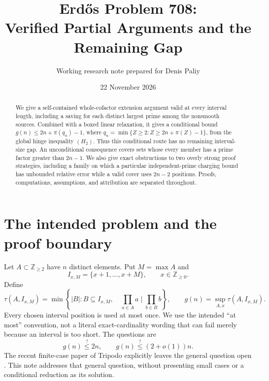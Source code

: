 \documentclass[11pt,a4paper]{article}
\title{Erd\H{o}s Problem 708:\\Verified Partial Arguments and the Remaining Gap}
\author{Working research note prepared for Denis Paliy}
\date{22 November 2026}
\theoremstyle{remark}
\newcommand{\II}{I_{x,M}}
\begin{document}
\maketitle
\begin{center}
\end{center}

\begin{abstract}
We give a self-contained whole-cofactor extension argument valid at every
interval length, including a saving for each distinct largest prime among
the nonsmooth sources. Combined with a boxed linear relaxation, it gives a
conditional bound $g(n)\le 2n+\pi(q_n)-1$, where
$q_n=\min\{Z\ge2:Z\ge2n+\pi(Z)-1\}$, from the global hinge inequality
$(H_2)$. Thus this conditional route has no remaining interval-size gap.
An unconditional consequence covers sets whose every member has a prime
factor greater than $2n-1$. We also give exact obstructions to two
overly strong proof strategies, including a family on which a particular
independent-prime charging bound has unbounded relative error while a
valid cover uses $2n-2$ positions. Proofs, computations, assumptions, and
attribution are separated throughout.
\end{abstract}

\section{The intended problem and the proof boundary}
Let $A\subset\mathbb Z_{\ge2}$ have $n$ distinct elements. Put
$M=\max A$ and
\[
 \II=\{x+1,\ldots,x+M\},\qquad x\in\mathbb Z_{\ge0}.
\]
Define
\[
 \tau(A,\II)=\min\left\{|B|:B\subseteq\II,\quad
              \prod_{a\in A}a\mid\prod_{b\in B}b\right\},
 \qquad g(n)=\sup_{A,x}\tau(A,\II).
\]
Every chosen interval position is used at most once. We use the intended
``at most'' convention, not a literal exact-cardinality wording that can
fail merely because an interval is too short. The questions are
\[
 g(n)\stackrel{?}{\le}2n,\qquad
 g(n)\stackrel{?}{\le}(2+o(1))n.
\]
The recent finite-case paper of Tripodo explicitly leaves the general
question open \cite{tripodo}. This note addresses that general question,
without presenting small cases or a conditional reduction as its solution.
\end{document}
